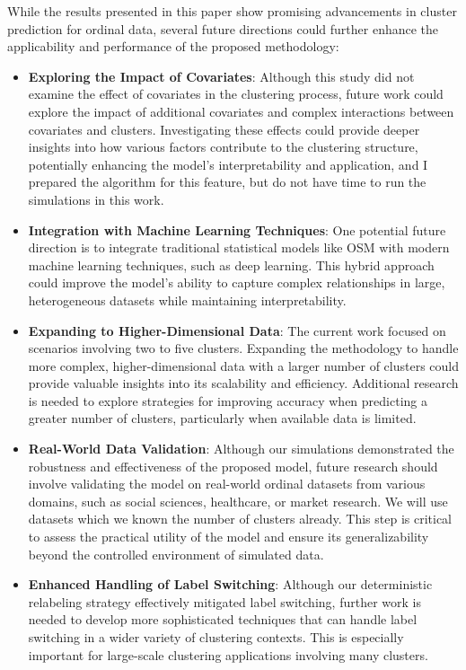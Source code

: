 \documentclass{article}
\begin{document}
While the results presented in this paper show promising advancements in cluster prediction for ordinal data, several future directions could further enhance the applicability and performance of the proposed methodology:

\begin{itemize}
    \item \textbf{Exploring the Impact of Covariates}: Although this study did not examine the effect of covariates in the clustering process, future work could explore the impact of additional covariates and complex interactions between covariates and clusters. Investigating these effects could provide deeper insights into how various factors contribute to the clustering structure, potentially enhancing the model's interpretability and application, and I prepared the algorithm for this feature, but do not have time to run the simulations in this work.

    \item \textbf{Integration with Machine Learning Techniques}: One potential future direction is to integrate traditional statistical models like OSM with modern machine learning techniques, such as deep learning. This hybrid approach could improve the model's ability to capture complex relationships in large, heterogeneous datasets while maintaining interpretability.

    \item \textbf{Expanding to Higher-Dimensional Data}: The current work focused on scenarios involving two to five clusters. Expanding the methodology to handle more complex, higher-dimensional data with a larger number of clusters could provide valuable insights into its scalability and efficiency. Additional research is needed to explore strategies for improving accuracy when predicting a greater number of clusters, particularly when available data is limited.

    \item \textbf{Real-World Data Validation}: Although our simulations demonstrated the robustness and effectiveness of the proposed model, future research should involve validating the model on real-world ordinal datasets from various domains, such as social sciences, healthcare, or market research. We will use datasets which we known the number of clusters already. This step is critical to assess the practical utility of the model and ensure its generalizability beyond the controlled environment of simulated data.

    \item \textbf{Enhanced Handling of Label Switching}: Although our deterministic relabeling strategy effectively mitigated label switching, further work is needed to develop more sophisticated techniques that can handle label switching in a wider variety of clustering contexts. This is especially important for large-scale clustering applications involving many clusters.

\end{itemize}
\end{document}
